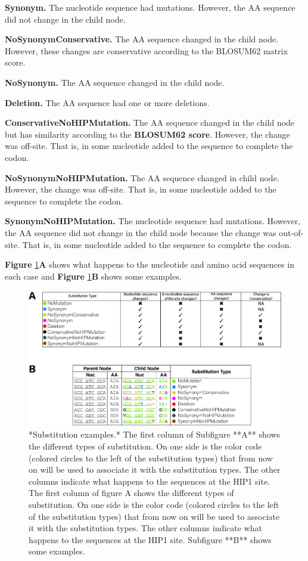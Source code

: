 \documentclass[
]{book}
\begin{document}
\textbf{Synonym.} The nucleotide sequence had mutations. However, the AA sequence did not change in the child node.

\textbf{NoSynonymConservative.} The AA sequence changed in the child node. However, these changes are conservative according to the BLOSUM62 matrix score.

\textbf{NoSynonym.} The AA sequence changed in the child node.

\textbf{Deletion.} The AA sequence had one or more deletions.

\textbf{ConservativeNoHIPMutation.} The AA sequence changed in the child node but has similarity according to the \textbf{BLOSUM62 score}. However, the change was off-site. That is, in some nucleotide added to the sequence to complete the codon.

\textbf{NoSynonymNoHIPMutation.} The AA sequence changed in child node. However, the change was off-site. That is, in some nucleotide added to the sequence to complete the codon.

\textbf{SynonymNoHIPMutation.} The nucleotide sequence had mutations. However, the AA sequence did not change in the child node because the change was out-of-site. That is, in some nucleotide added to the sequence to complete the codon.

\textbf{Figure} \ref{fig:FIG4x}\textbf{A} shows what happens to the nucleotide and amino acid sequences in each case and \textbf{Figure} \ref{fig:FIG4x}\textbf{B} shows some examples.

\begin{figure}

{\centering \includegraphics[width=1\linewidth]{figures/4x/table1} 

}

\caption{*Substitution examples.* The first column of Subfigure **A** shows the different types of substitution. On one side is the color code (colored circles to the left of the substitution types) that from now on will be used to associate it with the substitution types. The other columns indicate what happens to the sequences at the HIP1 site. The first column of figure A shows the different types of substitution. On one side is the color code (colored circles to the left of the substitution types) that from now on will be used to associate it with the substitution types. The other columns indicate what happens to the sequences at the HIP1 site. Subfigure **B** shows some examples. }\label{fig:FIG4x}
\end{figure}
\end{document}
